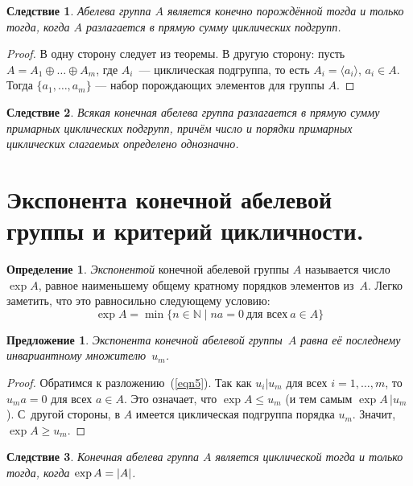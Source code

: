 \documentclass[a4paper, 12pt]{article}
\def\NN{{\mathbb N}}%
\newtheorem{proposition}{Предложение}
\newtheorem{corollary}{Следствие}
\theoremstyle{definition}
\newtheorem{definition}{Определение}
\theoremstyle{remark}
\begin{document}
\begin{corollary}
Абелева группа $A$ является конечно порождённой тогда и только тогда, когда $A$ разлагается в прямую сумму циклических подгрупп. 
\end{corollary}

\begin{proof}
В одну сторону следует из теоремы. В другую сторону: пусть $A = A_1 \oplus \ldots \oplus A_m$, где $A_i$~--- циклическая подгруппа, то есть $A_i = \langle a_i \rangle$, $a_i \in A$. Тогда $\{a_1, \ldots, a_m \}$ --- набор порождающих элементов для группы $A$.
\end{proof}

\begin{corollary}
Всякая конечная абелева группа разлагается в прямую сумму примарных
циклических подгрупп, причём число и порядки примарных циклических
слагаемых определено однозначно.
\end{corollary}


\section{Экспонента конечной абелевой группы и критерий цикличности.}

\begin{definition}
{\it Экспонентой} конечной абелевой группы $A$ называется число
$\exp A$, равное наименьшему общему кратному порядков элементов
из~$A$. Легко заметить, что это равносильно следующему условию:
$$
\exp A = \min \lbrace n \in \NN \mid na = 0 \
\text{для всех} \ a \in A \rbrace
$$
\end{definition}

\begin{proposition}
Экспонента конечной абелевой группы~$A$ равна её последнему
инвариантному множителю~$u_m$.
\end{proposition}

\begin{proof}
Обратимся к разложению~(\ref{eqn5}). Так как $u_i | u_m$ для всех $i
= 1, \ldots, m$, то $u_ma=0$ для всех $a \in A$. Это означает, что
$\exp A \leqslant u_m$ (и тем самым $\exp A \, | u_m$). С~другой
стороны, в $A$ имеется циклическая подгруппа порядка $u_m$. Значит,
$\exp A \geqslant u_m$.
\end{proof}

\begin{corollary}
Конечная абелева группа $A$ является циклической тогда и только
тогда, когда $\exp A =\nobreak |A|$.
\end{corollary}
\end{document}
